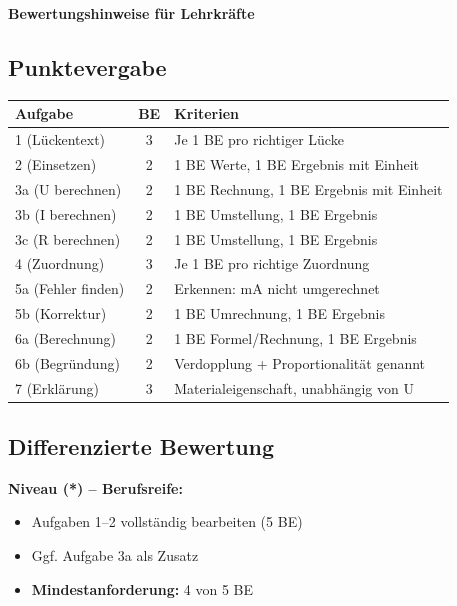 \documentclass[11pt, a4paper]{article}
\begin{document}

\newpage

\begin{center}
    {\Large\textbf{\textcolor{loesung}{Bewertungshinweise für Lehrkräfte}}}
\end{center}

\vspace{1em}

\subsection*{Punktevergabe}

\begin{tabular}{|l|c|l|}
\hline
\textbf{Aufgabe} & \textbf{BE} & \textbf{Kriterien} \\
\hline
1 (Lückentext) & 3 & Je 1 BE pro richtiger Lücke \\
\hline
2 (Einsetzen) & 2 & 1 BE Werte, 1 BE Ergebnis mit Einheit \\
\hline
3a (U berechnen) & 2 & 1 BE Rechnung, 1 BE Ergebnis mit Einheit \\
\hline
3b (I berechnen) & 2 & 1 BE Umstellung, 1 BE Ergebnis \\
\hline
3c (R berechnen) & 2 & 1 BE Umstellung, 1 BE Ergebnis \\
\hline
4 (Zuordnung) & 3 & Je 1 BE pro richtige Zuordnung \\
\hline
5a (Fehler finden) & 2 & Erkennen: mA nicht umgerechnet \\
\hline
5b (Korrektur) & 2 & 1 BE Umrechnung, 1 BE Ergebnis \\
\hline
6a (Berechnung) & 2 & 1 BE Formel/Rechnung, 1 BE Ergebnis \\
\hline
6b (Begründung) & 2 & Verdopplung + Proportionalität genannt \\
\hline
7 (Erklärung) & 3 & Materialeigenschaft, unabhängig von U \\
\hline
\end{tabular}

\vspace{1.5em}

\subsection*{Differenzierte Bewertung}

\textbf{Niveau (*) -- Berufsreife:}
\begin{itemize}
    \item Aufgaben 1--2 vollständig bearbeiten (5 BE)
    \item Ggf. Aufgabe 3a als Zusatz
    \item \textbf{Mindestanforderung:} 4 von 5 BE
\end{itemize}
\end{document}
